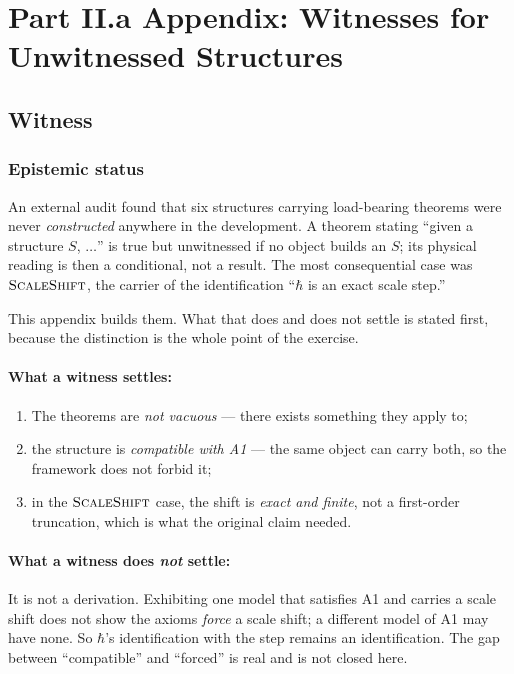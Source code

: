 \section{Part II.a Appendix: Witnesses for Unwitnessed Structures}

\subsection{Witness}

\subsubsection*{Epistemic status}

An external audit found that six structures carrying load-bearing theorems were never
\emph{constructed} anywhere in the development.  A theorem stating ``given a structure
$S$, $\ldots$'' is true but unwitnessed if no object builds an $S$; its physical reading
is then a conditional, not a result.  The most consequential case was $\text{\textsc{ScaleShift}}$,
the carrier of the identification ``$\hbar$ is an exact scale step.''

This appendix builds them.  What that does and does not settle is stated first, because
the distinction is the whole point of the exercise.

\paragraph{What a witness settles:}
\begin{enumerate}
\item The theorems are \emph{not vacuous} — there exists something they apply to;
\item the structure is \emph{compatible with A1} — the same object can carry both, so
  the framework does not forbid it;
\item in the $\text{\textsc{ScaleShift}}$ case, the shift is \emph{exact and finite}, not a
  first-order truncation, which is what the original claim needed.
\end{enumerate}

\paragraph{What a witness does \emph{not} settle:}

It is not a derivation.  Exhibiting one model that satisfies A1 and carries
a scale shift does not show the axioms \emph{force} a scale shift; a different model
of A1 may have none.  So $\hbar$'s identification with the step remains an
identification.  The gap between ``compatible'' and ``forced'' is real and is not
closed here.

